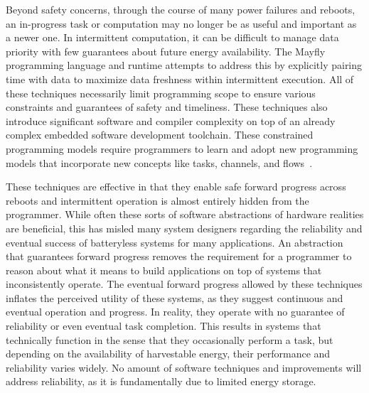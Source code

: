 Beyond safety concerns, through the course of many power failures and reboots, an in-progress task or computation may no longer be as useful and important as a newer one.
In intermittent computation, it can be difficult to manage data priority with few guarantees about future energy availability. The Mayfly~\cite{hesterTimely17} programming language and runtime attempts to address this by explicitly pairing time with data to maximize data freshness within intermittent execution.
All of these techniques necessarily limit programming scope to ensure various constraints and guarantees of safety and timeliness. These techniques also introduce significant software and compiler complexity on top of an already complex embedded software development toolchain.
These constrained programming models require programmers to learn and adopt new programming models that incorporate new concepts like tasks, channels, and flows~\cite{colin2016chain,maeng2017alpaca,hesterTimely17}.

These techniques are effective in that they enable safe forward progress across reboots and intermittent operation is almost entirely hidden from the programmer.
While often these sorts of software abstractions of hardware realities are beneficial, this has misled many system designers regarding the reliability and eventual success of batteryless systems for many applications.
An abstraction that guarantees forward progress removes the requirement for a programmer to
reason about what it means to build applications on top of systems that inconsistently operate.
The eventual forward progress allowed by these techniques inflates the perceived utility of these systems,
as they suggest continuous and eventual operation and progress. In reality, they operate with no guarantee of reliability or even eventual task completion.
This results in systems that technically function in the sense that they occasionally perform a task, but depending on the availability of harvestable energy, their performance and reliability varies widely.
No amount of software techniques and improvements will address reliability, as it is fundamentally due to limited energy storage.

